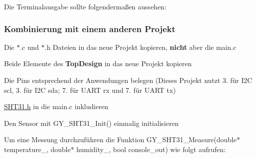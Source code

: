 Die Terminalausgabe sollte folgendermaßen aussehen\+: 
\begin{DoxyCode}{0}
\end{DoxyCode}
\hypertarget{autotoc_md0_autotoc_md4}{}\subsubsection{Kombinierung mit einem anderen Projekt}\label{autotoc_md0_autotoc_md4}

\begin{DoxyItemize}
\item Die $\ast$.c und $\ast$.h Dateien in das neue Projekt kopieren, {\bfseries{nicht}} aber die main.\+c
\item Beide Elemente des {\bfseries{Top\+Design}} in das neue Projekt kopieren
\item Die Pins entsprechend der Anwendungen belegen (Dieses Projekt nutzt 3. für I2C scl, 3. für I2C sda; 7. für U\+A\+RT rx und 7. für U\+A\+RT tx)
\item \mbox{\hyperlink{_s_h_t31_8h_source}{S\+H\+T31.\+h}} in die main.\+c inkludieren
\item Den Sensor mit {\ttfamily G\+Y\+\_\+\+S\+H\+T31\+\_\+\+Init()} einmalig initialisieren
\end{DoxyItemize}

Um eine Messung durchzuführen die Funktion {\ttfamily G\+Y\+\_\+\+S\+H\+T31\+\_\+\+Measure(double$\ast$ temperature\+\_\+, double$\ast$ humidity\+\_\+, bool console\+\_\+out)} wie folgt aufrufen\+: 
\begin{DoxyCode}{0}
\DoxyCodeLine{}
\end{DoxyCode}


